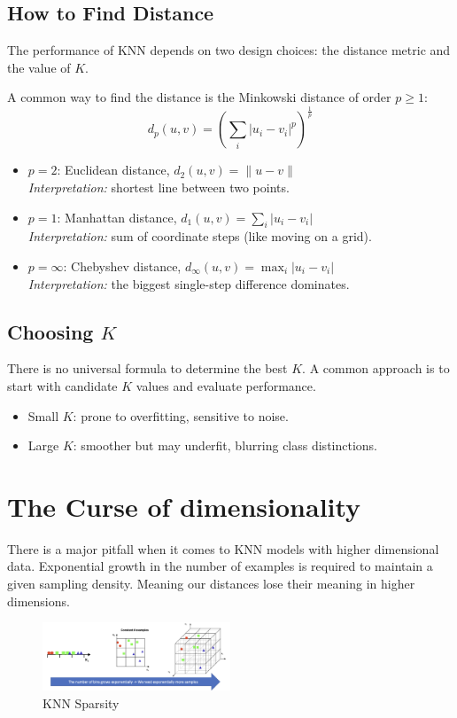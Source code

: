 \documentclass[11pt]{article}
\begin{document}
\subsection*{How to Find Distance}
The performance of KNN depends on two design choices: the distance metric and the value of $K$.

A common way to find the distance is the Minkowski distance of order $p \geq 1$:
\[
	d_p(u, v) = \left( \sum_i |u_i - v_i|^p \right)^{\tfrac{1}{p}}
\]
\begin{itemize}
	\item $p = 2$: Euclidean distance, $d_2(u,v) = \|u - v\|$ \\
	      \textit{Interpretation:} shortest line between two points.
	\item $p = 1$: Manhattan distance, $d_1(u,v) = \sum_i |u_i - v_i|$ \\
	      \textit{Interpretation:} sum of coordinate steps (like moving on a grid).
	\item $p = \infty$: Chebyshev distance, $d_\infty(u,v) = \max_i |u_i - v_i|$ \\
	      \textit{Interpretation:} the biggest single-step difference dominates.
\end{itemize}

\subsection*{Choosing $K$}

There is no universal formula to determine the best $K$.
A common approach is to start with candidate $K$ values and evaluate performance.
\begin{itemize}
	\item Small $K$: prone to overfitting, sensitive to noise.
	\item Large $K$: smoother but may underfit, blurring class distinctions.
\end{itemize}


\section*{The Curse of dimensionality}
There is a major pitfall when it comes to KNN models with higher dimensional data.
Exponential growth in the number of examples is required to maintain a given sampling density.
Meaning our distances lose their meaning in higher dimensions.

\begin{figure}[ht!]
	\centering
	\includegraphics[width=0.5\textwidth]{../imgs/knn-dims.png} %
	\caption{KNN Sparsity}
\end{figure}
\end{document}
